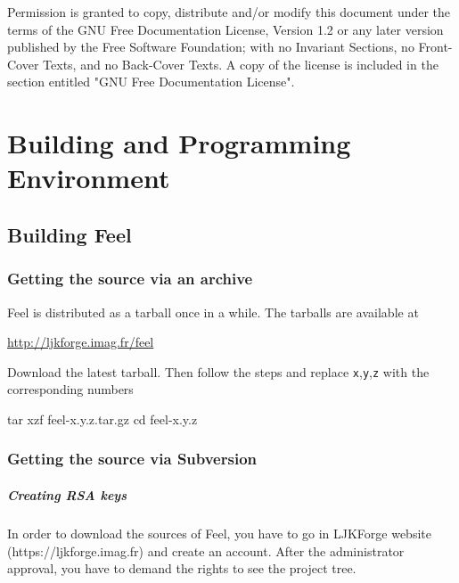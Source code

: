 \documentclass[a4paper]{book}
\newcommand{\feel}{Feel\xspace}
\begin{document}
\thispagestyle{empty}


\vfill
Permission is granted to copy, distribute and/or modify this document
under the terms of the GNU Free Documentation License, Version 1.2
or any later version published by the Free Software Foundation;
with no Invariant Sections, no Front-Cover Texts, and no Back-Cover Texts.
A copy of the license is included in the section entitled "GNU
Free Documentation License".

\newpage

\tableofcontents

\chapter{Building and Programming Environment}


\section{Building Feel}

\subsection{Getting the source via an archive}
\label{sec:getting-source-via-1}

\feel is distributed as a tarball once in a while. The tarballs are available
at
\begin{center}
  \href{http://ljkforge.imag.fr/feel}{http://ljkforge.imag.fr/feel}
\end{center}
Download the latest tarball. Then follow the steps and replace
\texttt{x},\texttt{y},\texttt{z} with the corresponding numbers

\begin{unixcom}
  tar xzf feel-x.y.z.tar.gz
  cd feel-x.y.z
\end{unixcom}


\subsection{Getting the source via Subversion}
\label{sec:getting-source-via}

\paragraph{Creating RSA keys}
\label{sec:creation-rsa-keys}
In order to download the sources of \feel, you have to go in
LJKForge website (https://ljkforge.imag.fr) and create an account. After the
administrator approval, you have to demand the rights to see the project tree.
\end{document}
